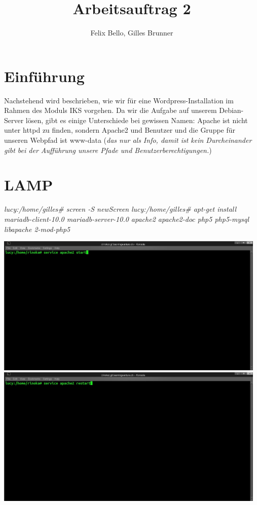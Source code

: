 \documentclass{article}
\author{Felix Bello, Gilles Brunner}
\title{Arbeitsauftrag 2}
\begin{document}
	\maketitle
	\section{Einführung}
	Nachstehend wird beschrieben, wie wir für eine Wordpress-Installation im Rahmen des Moduls IKS vorgehen.
	Da wir die Aufgabe auf unserem Debian-Server lösen, gibt es einige Unterschiede bei gewissen Namen: Apache ist nicht unter httpd zu finden, sondern Apache2 und Benutzer und die Gruppe für unseren Webpfad ist www-data (\textit{das nur als Info, damit ist kein Durcheinander gibt bei der Aufführung unsere Pfade und Benutzerberechtigungen.})
	\section{LAMP}
	\textit{lucy:/home/gilles\# screen -S newScreen}
	\newline
	\textit{lucy:/home/gilles\# apt-get install mariadb-client-10.0 mariadb-server-10.0 apache2 apache2-doc php5 php5-mysql libapache 2-mod-php5}
	\newline
	
	\includegraphics[width=13cm]{../Pics/start_apache}
	\includegraphics[width=13cm]{../Pics/apach2restart}
\end{document}
